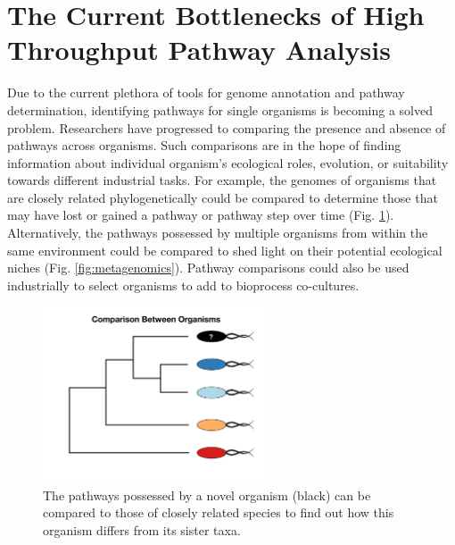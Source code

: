 \section{The Current Bottlenecks of High Throughput Pathway Analysis}

Due to the current plethora of tools for genome annotation and pathway determination, identifying pathways for single organisms is becoming a solved problem. Researchers have progressed to comparing the presence and absence of pathways across organisms. Such comparisons are in the hope of finding information about individual organism's ecological roles, evolution, or suitability towards different industrial tasks. For example, the genomes of organisms that are closely related phylogenetically could be compared to determine those that may have lost or gained a pathway or pathway step over time (Fig. \ref{fig:phylogenetic-comparison}). Alternatively, the pathways possessed by multiple organisms from within the same environment could be compared to shed light on their potential ecological niches (Fig. \ref{fig:metagenomics}). Pathway comparisons could also be used industrially to select organisms to add to bioprocess co-cultures.

\begin{figure}[!ht]
  \centering
	\includegraphics[width=0.6\textwidth]{media/compare-phylogenetically.pdf}
	 \caption{The pathways possessed by a novel organism (black) can be compared to those of closely related species to find out how this organism differs from its sister taxa.}
	 \label{fig:phylogenetic-comparison}
\end{figure}


